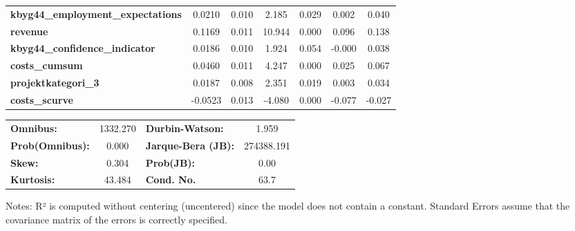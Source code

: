 \begin{center}
\begin{tabular}{lcccccc}
\textbf{kbyg44\_employment\_expectations} &       0.0210  &        0.010     &     2.185  &         0.029        &        0.002    &        0.040     \\
\textbf{revenue}                          &       0.1169  &        0.011     &    10.944  &         0.000        &        0.096    &        0.138     \\
\textbf{kbyg44\_confidence\_indicator}    &       0.0186  &        0.010     &     1.924  &         0.054        &       -0.000    &        0.038     \\
\textbf{costs\_cumsum}                    &       0.0460  &        0.011     &     4.247  &         0.000        &        0.025    &        0.067     \\
\textbf{projektkategori\_3}               &       0.0187  &        0.008     &     2.351  &         0.019        &        0.003    &        0.034     \\
\textbf{costs\_scurve}                    &      -0.0523  &        0.013     &    -4.080  &         0.000        &       -0.077    &       -0.027     \\
\bottomrule
\end{tabular}
\begin{tabular}{lclc}
\textbf{Omnibus:}       & 1332.270 & \textbf{  Durbin-Watson:     } &     1.959   \\
\textbf{Prob(Omnibus):} &   0.000  & \textbf{  Jarque-Bera (JB):  } & 274388.191  \\
\textbf{Skew:}          &   0.304  & \textbf{  Prob(JB):          } &      0.00   \\
\textbf{Kurtosis:}      &  43.484  & \textbf{  Cond. No.          } &      63.7   \\
\bottomrule
\end{tabular}
\end{center}

Notes: \newline
 [1] R² is computed without centering (uncentered) since the model does not contain a constant. \newline
 [2] Standard Errors assume that the covariance matrix of the errors is correctly specified.